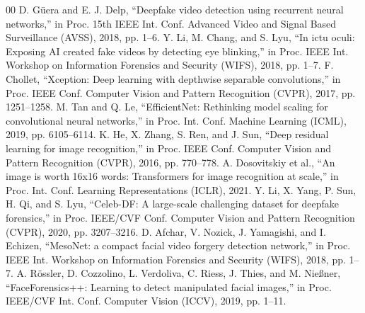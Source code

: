 \documentclass[runningheads]{llncs}
\begin{document}
\begin{thebibliography}{00}
 D. Güera and E. J. Delp, ``Deepfake video detection using recurrent neural networks,'' in Proc. 15th IEEE Int. Conf. Advanced Video and Signal Based Surveillance (AVSS), 2018, pp. 1--6.
 Y. Li, M. Chang, and S. Lyu, ``In ictu oculi: Exposing AI created fake videos by detecting eye blinking,'' in Proc. IEEE Int. Workshop on Information Forensics and Security (WIFS), 2018, pp. 1--7.
 F. Chollet, ``Xception: Deep learning with depthwise separable convolutions,'' in Proc. IEEE Conf. Computer Vision and Pattern Recognition (CVPR), 2017, pp. 1251--1258.
 M. Tan and Q. Le, ``EfficientNet: Rethinking model scaling for convolutional neural networks,'' in Proc. Int. Conf. Machine Learning (ICML), 2019, pp. 6105--6114.
 K. He, X. Zhang, S. Ren, and J. Sun, ``Deep residual learning for image recognition,'' in Proc. IEEE Conf. Computer Vision and Pattern Recognition (CVPR), 2016, pp. 770--778.
 A. Dosovitskiy et al., ``An image is worth 16x16 words: Transformers for image recognition at scale,'' in Proc. Int. Conf. Learning Representations (ICLR), 2021.
 Y. Li, X. Yang, P. Sun, H. Qi, and S. Lyu, ``Celeb-DF: A large-scale challenging dataset for deepfake forensics,'' in Proc. IEEE/CVF Conf. Computer Vision and Pattern Recognition (CVPR), 2020, pp. 3207--3216.
 D. Afchar, V. Nozick, J. Yamagishi, and I. Echizen, ``MesoNet: a compact facial video forgery detection network,'' in Proc. IEEE Int. Workshop on Information Forensics and Security (WIFS), 2018, pp. 1--7.
 A. Rössler, D. Cozzolino, L. Verdoliva, C. Riess, J. Thies, and M. Nießner, ``FaceForensics++: Learning to detect manipulated facial images,'' in Proc. IEEE/CVF Int. Conf. Computer Vision (ICCV), 2019, pp. 1--11.
\end{thebibliography}
\end{document}
